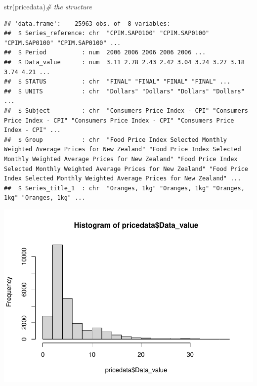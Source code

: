 \documentclass[
  landscape]{article}
\newenvironment{Shaded}{\begin{snugshade}}{\end{snugshade}}
\newcommand{\CommentTok}[1]{\textcolor[rgb]{0.56,0.35,0.01}{\textit{#1}}}
\newcommand{\FunctionTok}[1]{\textcolor[rgb]{0.00,0.00,0.00}{#1}}
\newcommand{\NormalTok}[1]{#1}
\newcommand{\SpecialCharTok}[1]{\textcolor[rgb]{0.00,0.00,0.00}{#1}}
\begin{document}
\begin{Shaded}
\begin{Highlighting}[]
\FunctionTok{str}\NormalTok{(pricedata)}\CommentTok{\# the structure}
\end{Highlighting}
\end{Shaded}

\begin{verbatim}
## 'data.frame':    25963 obs. of  8 variables:
##  $ Series_reference: chr  "CPIM.SAP0100" "CPIM.SAP0100" "CPIM.SAP0100" "CPIM.SAP0100" ...
##  $ Period          : num  2006 2006 2006 2006 2006 ...
##  $ Data_value      : num  3.11 2.78 2.43 2.42 3.04 3.24 3.27 3.18 3.74 4.21 ...
##  $ STATUS          : chr  "FINAL" "FINAL" "FINAL" "FINAL" ...
##  $ UNITS           : chr  "Dollars" "Dollars" "Dollars" "Dollars" ...
##  $ Subject         : chr  "Consumers Price Index - CPI" "Consumers Price Index - CPI" "Consumers Price Index - CPI" "Consumers Price Index - CPI" ...
##  $ Group           : chr  "Food Price Index Selected Monthly Weighted Average Prices for New Zealand" "Food Price Index Selected Monthly Weighted Average Prices for New Zealand" "Food Price Index Selected Monthly Weighted Average Prices for New Zealand" "Food Price Index Selected Monthly Weighted Average Prices for New Zealand" ...
##  $ Series_title_1  : chr  "Oranges, 1kg" "Oranges, 1kg" "Oranges, 1kg" "Oranges, 1kg" ...
\end{verbatim}

\begin{Shaded}
\end{Shaded}

\includegraphics{PDF_files/figure-latex/unnamed-chunk-2-1.pdf}
\end{document}
